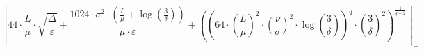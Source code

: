\[\left\lceil 44 \cdot \frac{L}{\mu} \cdot \sqrt{\frac{\Delta}{\varepsilon}} + \frac{1024 \cdot \sigma^{2} \cdot \left(\frac{L}{\mu} + \log\left(\frac{3}{\delta}\right)\right)}{\mu \cdot \varepsilon} + \left(\left(64 \cdot \left(\frac{L}{\mu}\right)^{2} \cdot \left(\frac{\nu}{\sigma}\right)^{2} \cdot \log\left(\frac{3}{\delta}\right)\right)^{q} \cdot \left(\frac{3}{\delta}\right)^{2}\right)^{\frac{1}{q - 2}} \right\rceil_{+}\]

